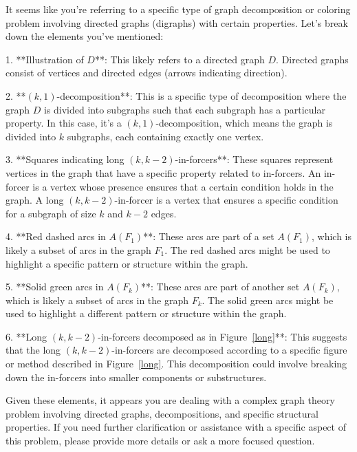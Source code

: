 It seems like you're referring to a specific type of graph decomposition or coloring problem involving directed graphs (digraphs) with certain properties. Let's break down the elements you've mentioned:

1. **Illustration of \( D \)**: This likely refers to a directed graph \( D \). Directed graphs consist of vertices and directed edges (arrows indicating direction).

2. **\((k,1)\)-decomposition**: This is a specific type of decomposition where the graph \( D \) is divided into subgraphs such that each subgraph has a particular property. In this case, it's a \((k,1)\)-decomposition, which means the graph is divided into \( k \) subgraphs, each containing exactly one vertex.

3. **Squares indicating long \((k,k-2)\)-in-forcers**: These squares represent vertices in the graph that have a specific property related to in-forcers. An in-forcer is a vertex whose presence ensures that a certain condition holds in the graph. A long \((k,k-2)\)-in-forcer is a vertex that ensures a specific condition for a subgraph of size \( k \) and \( k-2 \) edges.

4. **Red dashed arcs in \( A(F_1) \)**: These arcs are part of a set \( A(F_1) \), which is likely a subset of arcs in the graph \( F_1 \). The red dashed arcs might be used to highlight a specific pattern or structure within the graph.

5. **Solid green arcs in \( A(F_k) \)**: These arcs are part of another set \( A(F_k) \), which is likely a subset of arcs in the graph \( F_k \). The solid green arcs might be used to highlight a different pattern or structure within the graph.

6. **Long \((k,k-2)\)-in-forcers decomposed as in Figure~\ref{long}**: This suggests that the long \((k,k-2)\)-in-forcers are decomposed according to a specific figure or method described in Figure~\ref{long}. This decomposition could involve breaking down the in-forcers into smaller components or substructures.

Given these elements, it appears you are dealing with a complex graph theory problem involving directed graphs, decompositions, and specific structural properties. If you need further clarification or assistance with a specific aspect of this problem, please provide more details or ask a more focused question.
